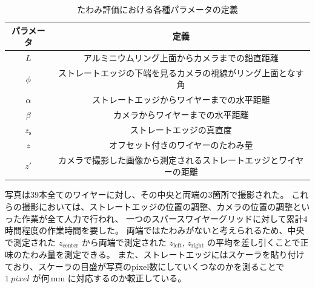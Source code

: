 \documentclass[../../main.tex]{subfiles}
\begin{document}
\begin{table}[H]
    \centering
    \caption{たわみ評価における各種パラメータの定義}
    \begin{tabular}{|c|c|}
        \hline
        パラメータ & 定義 \\
        \hline
        $L$ & アルミニウムリング上面からカメラまでの鉛直距離 \\
        $\phi$ & ストレートエッジの下端を見るカメラの視線がリング上面となす角 \\
        $\alpha$ & ストレートエッジからワイヤーまでの水平距離 \\
        $\beta$ & カメラからワイヤーまでの水平距離 \\
        $z_{\mathrm{s}}$ & ストレートエッジの真直度 \\
        $z$ & オフセット付きのワイヤーのたわみ量 \\
        $z'$ & カメラで撮影した画像から測定されるストレートエッジとワイヤーの距離 \\
        \hline
    \end{tabular}
    \label{tab:wiresag_setup_old}
\end{table}

写真は39本全てのワイヤーに対し、その中央と両端の3箇所で撮影された。
これらの撮影においては、ストレートエッジの位置の調整、カメラの位置の調整といった作業が全て人力で行われ、
一つのスパースワイヤーグリッドに対して累計4時間程度の作業時間を要した。
両端ではたわみがないと考えられるため、中央で測定された $z_{\text{center}}$ から両端で測定された $z_{\text{left}},\,z_{\text{right}}$ の平均を差し引くことで正味のたわみ量を測定できる。
また、ストレートエッジにはスケーラを貼り付けており、スケーラの目盛が写真のpixel数にしていくつなのかを測ることで
$\SI{1}{pixel}$ が何\,$\mathrm{mm}$ に対応するのか較正している。
\end{document}
